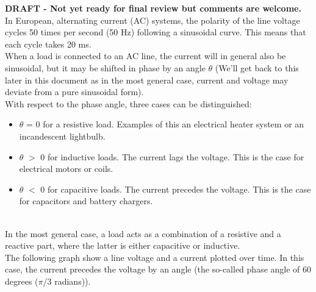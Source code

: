 \documentclass[a4paper]{article}
\begin{document}
\textbf{DRAFT - Not yet ready for final review but comments are welcome.}\\

In European, alternating current (AC) systems, the polarity of the line
voltage cycles 50 times  per second (50 Hz) following a sinusoidal curve. 
This means that each cycle takes 20 ms.\\

When a load is connected to an AC line, the current will in general also
be sinusoidal, but it may be shifted in phase by an angle $\theta$ (We'll 
get back to this later in this document as in the most general case,
current and voltage may deviate from a pure sinusoidal form).\\

With respect to the phase angle, three cases can be distinguished:

\begin{itemize}
	\item $\theta$ = 0 for a resistive load. Examples of this an electrical heater system or an incandescent lightbulb.
	\item $\theta$ $>$ 0 for inductive loads. The current lags the voltage. This is the case for electrical motors or coils.
	\item  $\theta$ $<$ 0 for capacitive loads. The current precedes the voltage. This is the case for capacitors and battery chargers.
\end{itemize}\\

In the most general case, a load acts as a combination of a resistive 
and a reactive part, where the latter is either capacitive or inductive.\\

The following graph show a line voltage and a current plotted over time. In
this case, the current precedes the voltage by an angle (the so-called phase
angle of 60 degrees ($\pi$/3 radians)).\\

\\
\end{document}
